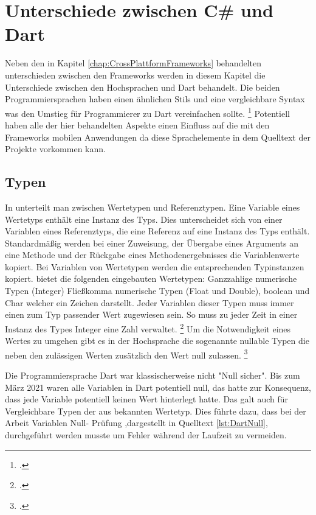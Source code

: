 \chapter{Unterschiede zwischen C\# und Dart}
\label{chap:Programmiersprachen}

Neben den in Kapitel \ref{chap:CrossPlattformFrameworks} behandelten unterschieden zwischen den Frameworks werden in diesem Kapitel die Unterschiede zwischen den Hochsprachen \Csharp und Dart behandelt.  Die beiden Programmiersprachen haben einen ähnlichen Stils und eine vergleichbare Syntax was den Umstieg für Programmierer zu Dart vereinfachen sollte.  \footcite[Vgl. ][Abgerufen am \today]{Pedley2019} Potentiell haben alle der hier behandelten Aspekte einen Einfluss auf die mit den Frameworks mobilen Anwendungen da diese Sprachelemente in dem Quelltext der Projekte vorkommen kann.  

\section{Typen}
In \Csharp unterteilt man zwischen Wertetypen und Referenztypen.  Eine Variable eines Wertetyps enthält eine Instanz des Typs.  Dies unterscheidet sich von einer Variablen eines Referenztyps, die eine Referenz auf eine Instanz des Typs enthält.  Standardmäßig werden bei einer Zuweisung,  der Übergabe eines Arguments an eine Methode und der Rückgabe eines Methodenergebnisses die Variablenwerte kopiert. Bei Variablen von Wertetypen werden die entsprechenden Typinstanzen kopiert.  \Csharp bietet die folgenden eingebauten Wertetypen: Ganzzahlige numerische Typen (Integer) Fließkomma numerische Typen (Float und Double), boolean und Char welcher ein Zeichen darstellt.  Jeder Variablen dieser  Typen muss immer einen zum Typ passender Wert zugewiesen sein.  So muss zu jeder Zeit in einer Instanz des Types Integer eine Zahl verwaltet. \footcite[Vgl. ][Abgerufen am \today]{MicrosoftValueTypes2020} Um die Notwendigkeit eines Wertes zu umgehen gibt es in der Hochsprache die sogenannte nullable Typen die neben den zulässigen Werten zusätzlich den Wert null zulassen. \footcite[Vgl.][S. 167]{Bayer2008} 

Die Programmiersprache Dart war klassischerweise nicht "Null sicher".  Bis zum März 2021 waren alle Variablen in Dart potentiell null,  das hatte zur Konsequenz, dass jede Variable potentiell keinen Wert hinterlegt hatte.   Das galt auch für Vergleichbare Typen der aus \Csharp bekannten Wertetyp.  Dies führte dazu,  dass bei der Arbeit Variablen Null- Prüfung ,dargestellt in Quelltext \ref{lst:DartNull},  durchgeführt werden musste um Fehler während der Laufzeit zu vermeiden.

